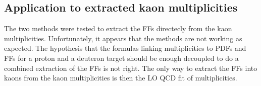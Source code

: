 \subsection{Application to extracted kaon multiplicities}

The two methods were tested to extract the FFs directecly from the kaon multiplicities. Unfortunately, it appears that the methods are not working as expected. The hypothesis that the formulas linking multiplicities to PDFs and FFs for a proton and a deuteron target should be enough decoupled to do a combined extraction of the FFs is not right. The only way to extract the FFs into kaons from the kaon multiplicities is then the LO QCD fit of multiplicities.
